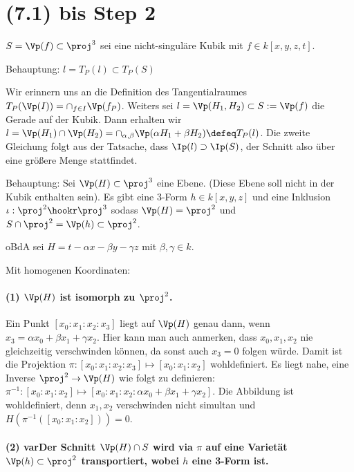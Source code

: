 \section{(7.1) bis Step 2}
$S = \Vp(f) \subset \proj^3$ sei eine nicht-singuläre Kubik mit $f \in k[x,y,z,t]$.

{\LARGE %
Behauptung: $l =  T_P(l) \subset T_P(S)$
} %

Wir erinnern uns an die Definition des Tangentialraumes $T_P(\Vp(I)) = \cap_{f\in I} \Vp(f_P)$.
Weiters sei $l = \Vp(H_1, H_2) \subset S := \Vp(f)$ die Gerade auf der Kubik.
Dann erhalten wir $l = \Vp(H_1) \cap \Vp(H_2) = \cap_{\alpha, \beta} \Vp(\alpha H_1 + \beta H_2) \defeq  T_P(l)$.
Die zweite Gleichung folgt aus der Tatsache, dass $\Ip(l) \supset \Ip(S)$, der Schnitt also über eine größere Menge stattfindet.


{\LARGE %
Behauptung: Sei $\Vp(H) \subset \proj^3$ eine Ebene.
(Diese Ebene soll nicht in der Kubik enthalten sein).
Es gibt eine 3-Form $h \in k[x,y,z]$ und eine Inklusion $\iota : \proj^2 \hookr \proj^3$ sodass $\Vp(H) = \proj^2$ und $S\cap \proj^2 = \Vp(h) \subset \proj^2$.
} %

oBdA sei $H = t - \alpha x -  \beta y - \gamma z$ mit $\beta, \gamma \in k$.

Mit homogenen Koordinaten:
\paragraph{(1) $\Vp(H)$ ist isomorph zu $\proj^2$.}
Ein Punkt $[x_0:x_1:x_2:x_3]$ liegt auf $\Vp(H)$ genau dann, wenn $x_3 = \alpha x_0 + \beta x_1 + \gamma x_2$.
Hier kann man auch anmerken, dass $x_0,x_1,x_2$ nie gleichzeitig verschwinden können, da sonst auch $x_3 = 0$ folgen würde.
Damit ist die Projektion $\pi : [x_0:x_1:x_2:x_3] \mapsto [x_0:x_1:x_2]$ wohldefiniert.
Es liegt nahe, eine Inverse $\proj^2 \to \Vp(H)$ wie folgt zu definieren:
$\pi^{-1} : [x_0:x_1:x_2] \mapsto [x_0 : x_1 : x_2 : \alpha x_0 + \beta x_1 + \gamma x_2]$.
Die Abbildung ist wohldefiniert, denn $x_1,x_2$ verschwinden nicht simultan und $H(\pi^{-1}([x_0:x_1:x_2])) = 0$.

\paragraph{(2) var{Der} Schnitt $\Vp(H) \cap S$ wird via $\pi$ auf eine Varietät $\Vp(h) \subset \proj^2$ transportiert, wobei $h$ eine 3-Form ist.}

